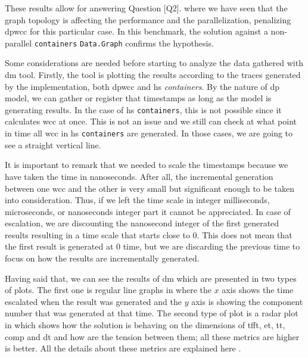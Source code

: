 These results allow for answering Question [Q2]. where we have seen that the graph topology is affecting the performance and the parallelization, penalizing \acrshort{dpwcc} for this particular case. In this benchmark, 
the solution against a non-parallel \texttt{containers} \texttt{Data.Graph} confirms the hypothesis. 

Some considerations are needed before starting to analyze the data gathered with \acrshort{dm} tool. Firstly, the tool is plotting the results according to the traces generated by the implementation, 
both \acrshort{dpwcc} and \acrshort{hs} \emph{containers}. By the nature of \acrshort{dp} model, we can gather or register that timestamps as long as the model is generating results. In the case of \acrshort{hs} \texttt{containers}, this is not possible since it 
calculates \acrshort{wcc} at once. This is not an issue and we still can check at what point in time all \acrshort{wcc} in \acrshort{hs} \texttt{containers} are generated. In those cases, we are going to see a straight vertical line. 

It is important to remark that we needed to scale the timestamps because we have taken the time in nanoseconds. After all, the incremental generation between one \acrshort{wcc} and the other is very 
small but significant enough to be taken into consideration. Thus, if we left the time scale in integer milliseconds, microseconds, or nanoseconds integer part it cannot be appreciated. In case of escalation, we are discounting 
the nanosecond integer of the first generated results resulting in a time scale that starts close to $0$. This does not mean that the first result is generated at $0$ time, but we are discarding the previous time to focus on how the results are incrementally generated.

Having said that, we can see the results of \acrshort{dm} which are presented in two types of plots. The first one is regular line graphs in where the $x$ axis shows the time escalated when 
the result was generated and the $y$ axis is showing the component number that was generated at that time. The second type of plot is a radar plot in which shows how the solution is behaving 
on the dimensions of  \acrfull{tfft}, \acrfull{et}, \acrfull{tt}, \acrfull{comp} and \acrfull{dt} and how are the tension between them; all these metrics are higher is better. 
All the details about these metrics are explained here \cite{diefpaper}.

